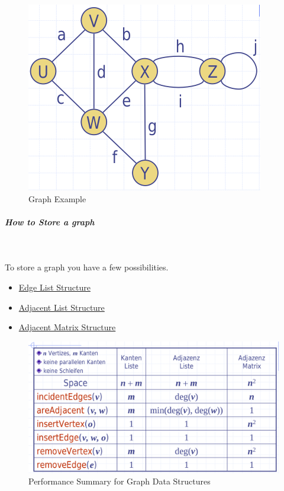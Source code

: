 \documentclass[11pt,twoside,twocolumn,landscape]{article}
\begin{document}
\begin{figure}[htbp]
\centering
\includegraphics[width=.9\linewidth]{img/graph_example.png}
\caption{\label{fig:orga771366}Graph Example}
\end{figure}

\subparagraph{How to Store a graph} \
\label{sec:org4c4fd20}

To store a graph you have a few possibilities.
\begin{itemize}
\item \href{../../../roam/20220201173524-edge_list_structure.org}{Edge List Structure}
\item \href{../../../roam/20220201180442-adjacent_list_structure.org}{Adjacent List Structure}
\item \href{../../../roam/20220201180955-adjacent_matrix_structure.org}{Adjacent Matrix Structure}
\end{itemize}


\begin{figure}[htbp]
\centering
\includegraphics[width=.9\linewidth]{img/graph_data_structure_summary_running_time.png}
\caption{\label{fig:org8ab9949}Performance Summary for Graph Data Structures}
\end{figure}
\end{document}

